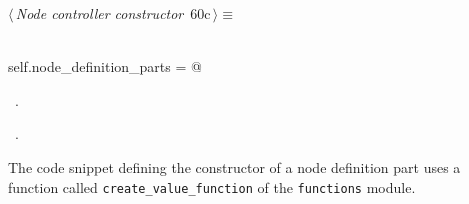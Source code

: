 \documentclass[
    a4paper,      %
    10pt,         %
    openright,    %
    notitlepage,  %
    parskip=half, %
]{scrreprt}       %
\theoremstyle{definition}                    %
\begin{document}
\begin{flushleft} \small
\begin{minipage}{\linewidth}\label{scrap102}\raggedright\small
{} $\langle\,${\itshape Node controller constructor}\nobreak\ {\footnotesize {60c}}$\,\rangle\equiv$
\vspace{-1exm}
\begin{list}{}{} \item
\mbox{}\lstinline@@\\
\mbox{}\lstinline@    self.node_definition_parts = {}@\\
\mbox{}\lstinline@@{\NWsep}
\end{list}
\vspace{-1.5ex}
\footnotesize
\begin{list}{}{\setlength{\itemsep}{-\parsep}\setlength{\itemindent}{-\leftmargin}}
\item \NWtxtMacroDefBy\ .
\item \NWtxtMacroRefIn\ .

\item{}
\end{list}
\end{minipage}\vspace{4ex}
\end{flushleft}
The code snippet defining the constructor of a node definition part uses a
function called \verb+create_value_function+ of the \verb+functions+ module.
\end{document}
